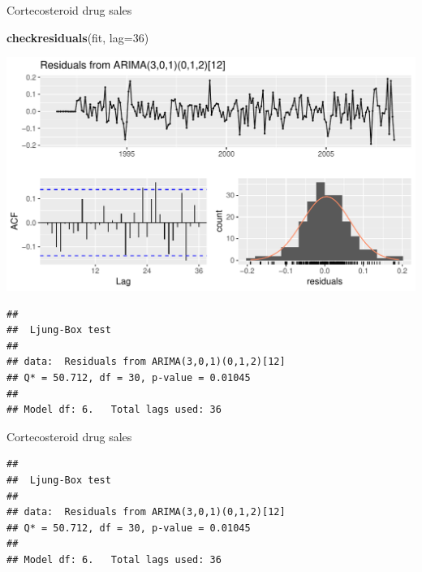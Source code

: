 \documentclass[14pt,ignorenonframetext,]{beamer}
\newenvironment{Shaded}{\begin{snugshade}}{\end{snugshade}}
\newcommand{\KeywordTok}[1]{\textcolor[rgb]{0.13,0.29,0.53}{\textbf{#1}}}
\newcommand{\DataTypeTok}[1]{\textcolor[rgb]{0.13,0.29,0.53}{#1}}
\newcommand{\DecValTok}[1]{\textcolor[rgb]{0.00,0.00,0.81}{#1}}
\newcommand{\NormalTok}[1]{#1}
\begin{document}
\begin{frame}[fragile]{Cortecosteroid drug sales}

\begin{Shaded}
\begin{Highlighting}[]
\KeywordTok{checkresiduals}\NormalTok{(fit, }\DataTypeTok{lag=}\DecValTok{36}\NormalTok{)}
\end{Highlighting}
\end{Shaded}

\includegraphics{week_5_arima_files/figure-beamer/h02res-1.pdf}

\begin{verbatim}
## 
##  Ljung-Box test
## 
## data:  Residuals from ARIMA(3,0,1)(0,1,2)[12]
## Q* = 50.712, df = 30, p-value = 0.01045
## 
## Model df: 6.   Total lags used: 36
\end{verbatim}

\end{frame}

\begin{frame}[fragile]{Cortecosteroid drug sales}

\fontsize{11}{15}\sf

\begin{verbatim}
## 
##  Ljung-Box test
## 
## data:  Residuals from ARIMA(3,0,1)(0,1,2)[12]
## Q* = 50.712, df = 30, p-value = 0.01045
## 
## Model df: 6.   Total lags used: 36
\end{verbatim}

\end{frame}
\end{document}
